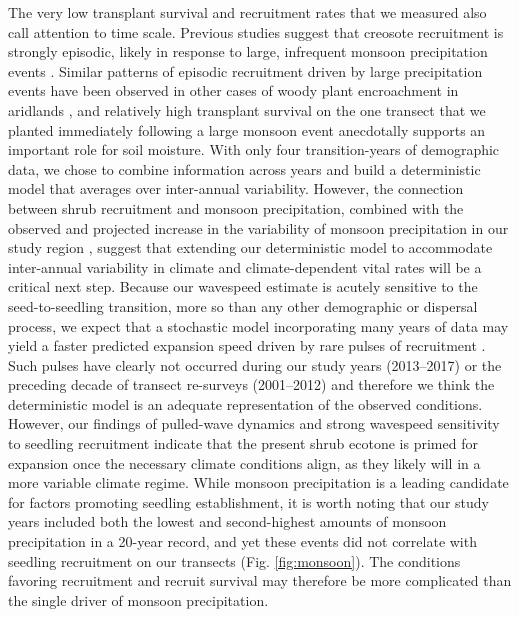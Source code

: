 \documentclass[11pt]{article}\usepackage[]{graphicx}\usepackage[usenames,dvipsnames]{xcolor}
\begin{document}
The very low transplant survival and recruitment rates that we measured also call attention to time scale. 
Previous studies suggest that creosote recruitment is strongly episodic, likely in response to large, infrequent monsoon precipitation events \citep{moreno2016seed,allen2008allometry,boyd1983postdispersal}.
Similar patterns of episodic recruitment driven by large precipitation events have been observed in other cases of woody plant encroachment in aridlands \citep{harrington1991effects,weber2022woody}, and relatively high transplant survival on the one transect that we planted immediately following a large monsoon event anecdotally supports an important role for soil moisture. 
With only four transition-years of demographic data, we chose to combine information across years and build a deterministic model that averages over inter-annual variability.
However, the connection between shrub recruitment and monsoon precipitation, combined with the observed and projected increase in the variability of monsoon precipitation in our study region \citep{petrie2014regional}, suggest that extending our deterministic model to accommodate inter-annual variability in climate and climate-dependent vital rates will be a critical next step. 
Because our wavespeed estimate is acutely sensitive to the seed-to-seedling transition, more so than any other demographic or dispersal process, we expect that a stochastic model incorporating many years of data may yield a faster predicted expansion speed driven by rare pulses of recruitment \citep{ellner2012temporally}. 
Such pulses have clearly not occurred during our study years (2013--2017) or the preceding decade of transect re-surveys (2001--2012) and therefore we think the deterministic model is an adequate representation of the observed conditions. 
However, our findings of pulled-wave dynamics and strong wavespeed sensitivity to seedling recruitment indicate that the present shrub ecotone is primed for expansion once the necessary climate conditions align, as they likely will in a more variable climate regime.
While monsoon precipitation is a leading candidate for factors promoting seedling establishment, it is worth noting that our study years included both the lowest and second-highest amounts of monsoon precipitation in a 20-year record, and yet these events did not correlate with seedling recruitment on our transects (Fig. \ref{fig:monsoon}). 
The conditions favoring recruitment and recruit survival may therefore be more complicated than the single driver of monsoon precipitation. 
\end{document}
